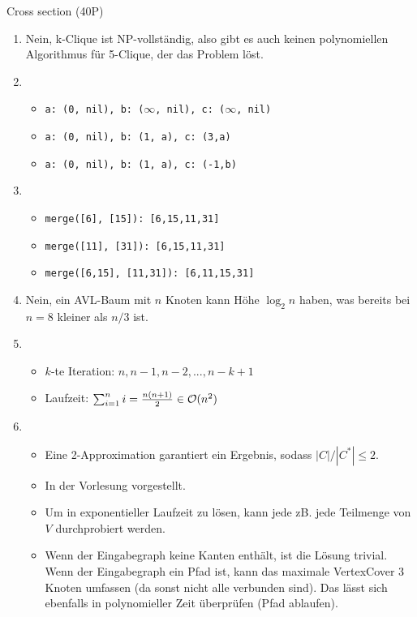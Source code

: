 \documentclass{article}
\begin{document}
\begin{exercise}{Cross section (40P)}
\begin{solution}
\begin{enumerate}
      \item Nein, k-Clique ist NP-vollständig, also gibt es auch keinen polynomiellen Algorithmus für 5-Clique, der das Problem löst.
      \item \begin{itemize}
              \item \texttt{a: (0, nil), b: ($\infty$, nil), c: ($\infty$, nil)}\par
              \item \texttt{a: (0, nil), b: (1, a), c: (3,a)}\par
              \item \texttt{a: (0, nil), b: (1, a), c: (-1,b)}
            \end{itemize}
      \item \begin{itemize}
              \item \texttt{merge([6], [15]): [6,15,11,31]}
              \item \texttt{merge([11], [31]): [6,15,11,31]}
              \item \texttt{merge([6,15], [11,31]): [6,11,15,31]}
            \end{itemize}
      \item Nein, ein AVL-Baum mit $n$ Knoten kann Höhe $\log_2 n$ haben, was bereits bei $n = 8$ kleiner als $n/3$ ist.
      \item \begin{itemize}
              \item $k$-te Iteration: $n, n-1, n-2, ..., n-k+1$
              \item Laufzeit: $\sum_{i=1}^{n} i = \frac{n(n+1)}{2} \in \mathcal{O}(n^2)$
            \end{itemize}
      \item \begin{itemize}
              \item[\xmark] Eine 2-Approximation garantiert ein Ergebnis, sodass $|C|/|C^*| \leq 2$.
              \item[\checkmark] In der Vorlesung vorgestellt.
              \item[\checkmark] Um  in exponentieller Laufzeit zu lösen, kann jede zB. jede Teilmenge von $V$ durchprobiert werden.
              \item[\checkmark] Wenn der Eingabegraph keine Kanten enthält, ist die Lösung trivial. Wenn der Eingabegraph ein Pfad ist, kann das maximale VertexCover 3 Knoten umfassen (da sonst nicht alle verbunden sind). Das lässt sich ebenfalls in polynomieller Zeit überprüfen (Pfad ablaufen).

\end{itemize}
\end{enumerate}
\end{solution}
\end{exercise}
\end{document}
